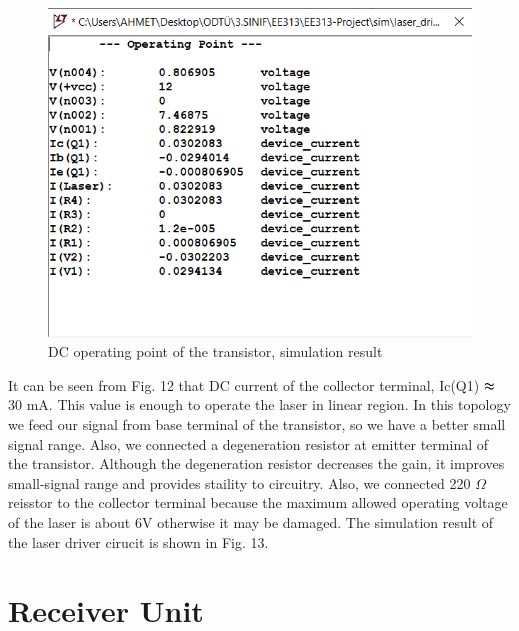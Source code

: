 \documentclass[conference]{IEEEtran}
\begin{document}
 \begin{figure}[H]
   \centerline{\includegraphics[scale=0.5]{DC_operating.png}}
    \caption{DC operating point of the transistor, simulation result}
\end{figure} 
\par It can be seen from Fig. 12 that DC current of the collector terminal, Ic(Q1) \(\thickapprox \) 30 mA. This value is enough to operate the laser in linear region. In this topology we feed our signal from base terminal of the transistor, so we have a better small signal range. Also, we connected a degeneration resistor at emitter terminal of the transistor. Although the degeneration resistor decreases the gain, it improves small-signal range and provides staility to circuitry. Also, we connected 220 \(\Omega\) reisstor to the collector terminal because the maximum allowed operating voltage of the laser is about 6V otherwise it may be damaged. The simulation result of the laser driver cirucit is shown in Fig. 13.  



\section{Receiver Unit}
\end{document}
